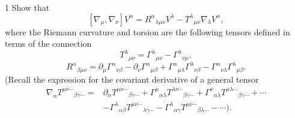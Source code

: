 \documentclass[11pt]{article}
\begin{document}
\begin{problem}{1}
	Show that
	\begin{equation}
		\label{eq:p1-covariant-commutator}
		[\nabla_\mu,\nabla_\nu]V^\alpha
		= R^\alpha{}_{\lambda\mu\nu}V^\lambda - T^\lambda{}_{\mu\nu}\nabla_\lambda V^\alpha,
	\end{equation}
	where the Riemann curvature and torsion are the following tensors defined in terms of the connection
	\begin{equation}
		\label{eq:p1-torsion}
		T^\lambda{}_{\mu\nu} = \Gamma^\lambda{}_{\mu\nu}-\Gamma^\lambda{}_{\nu\mu},
	\end{equation}
	\begin{equation}
		\label{eq:p1-riemann}
		R^\alpha{}_{\beta\mu\nu}
		= \partial_\mu\Gamma^\alpha{}_{\nu\beta}-\partial_\nu\Gamma^\alpha{}_{\mu\beta}
		+\Gamma^\alpha{}_{\mu\lambda}\Gamma^\lambda{}_{\nu\beta}
		-\Gamma^\alpha{}_{\nu\lambda}\Gamma^\lambda{}_{\mu\beta}.
	\end{equation}
	(Recall the expression for the covariant derivative of a general tensor
	\begin{equation}
		\label{eq:p1-general-covariant-derivative}
		\begin{aligned}
			\nabla_\alpha T^{\mu\nu\cdots}{}_{\beta\gamma\cdots}
			= {} & \partial_\alpha T^{\mu\nu\cdots}{}_{\beta\gamma\cdots}
			+ \Gamma^\mu{}_{\alpha\lambda}T^{\lambda\nu\cdots}{}_{\beta\gamma\cdots}
			+ \Gamma^\nu{}_{\alpha\lambda}T^{\mu\lambda\cdots}{}_{\beta\gamma\cdots}+\cdots \\
			     & -\Gamma^\lambda{}_{\alpha\beta}T^{\mu\nu\cdots}{}_{\lambda\gamma\cdots}
			-\Gamma^\lambda{}_{\alpha\gamma}T^{\mu\nu\cdots}{}_{\beta\lambda\cdots}-\cdots).
		\end{aligned}
	\end{equation}
\end{problem}
\end{document}
